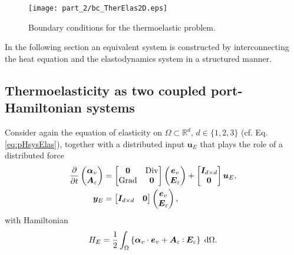 \begin{figure}[tb]
	\centering
	\texttt{[image: part\_2/bc\_TherElas2D.eps]}
	\caption{Boundary conditions for the thermoelastic problem.}
	\label{fig:bc_TherElas2D}
\end{figure}
In the following section an equivalent system is constructed by interconnecting the heat equation and the elastodynamics system in a structured manner.

\subsection{Thermoelasticity as two coupled port-Hamiltonian systems}

Consider again the equation of elasticity on $\Omega \subset \mathbb{R}^d, \, d \in \{1, 2, 3\}$ (cf. Eq. \eqref{eq:pHsysElas}), together with a distributed input $\bm{u}_E$ that plays the role of a distributed force
\begin{equation}
\begin{aligned}
\diffp{}{t}
\begin{pmatrix}
\bm{\alpha}_v \\
\bm{A}_{\varepsilon} \\
\end{pmatrix} &= 
\begin{bmatrix}
\bm{0} & \Div \\
\Grad & \bm{0} \\
\end{bmatrix}
\begin{pmatrix}
\bm{e}_v \\
\bm{E}_{\varepsilon} \\
\end{pmatrix} + 
\begin{bmatrix}
\bm{I}_{d\times d} \\
\bm{0} \\
\end{bmatrix}\bm{u}_E, \\
\bm{y}_E &= \begin{bmatrix}
\bm{I}_{d\times d} & \bm{0} \\
\end{bmatrix}
\begin{pmatrix}
\bm{e}_v \\
\bm{E}_{\varepsilon}
\end{pmatrix},
\end{aligned}
\end{equation}
with Hamiltonian  
\[
H_E = \energy{\bm{\alpha}_v \cdot \bm{e}_v + \bm{A}_{\varepsilon} \cddot \bm{E}_{\varepsilon}}.
\]
